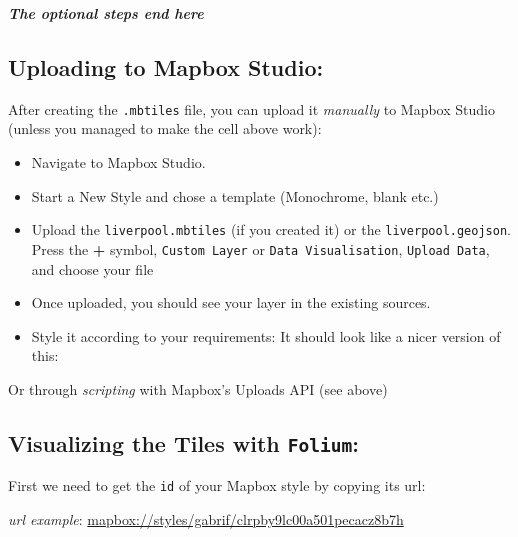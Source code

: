 \documentclass[
  letterpaper,
  DIV=11,
  numbers=noendperiod]{scrreprt}
\providecommand{\tightlist}{%
  \setlength{\itemsep}{0pt}\setlength{\parskip}{0pt}}\usepackage{longtable,booktabs,array}
\begin{document}
\textbf{\emph{The optional steps end here}}

\subsection{\texorpdfstring{Uploading to \textbf{Mapbox
Studio}:}{Uploading to Mapbox Studio:}}\label{uploading-to-mapbox-studio}

After creating the \texttt{.mbtiles} file, you can upload it
\emph{manually} to Mapbox Studio (unless you managed to make the cell
above work):

\begin{itemize}
\tightlist
\item
  Navigate to Mapbox Studio.
\item
  Start a New Style and chose a template (Monochrome, blank etc.)
\end{itemize}

\begin{itemize}
\tightlist
\item
  Upload the \texttt{liverpool.mbtiles} (if you created it) or the
  \texttt{liverpool.geojson}. Press the \textbf{+} symbol,
  \texttt{Custom\ Layer} or \texttt{Data\ Visualisation},
  \texttt{Upload\ Data}, and choose your file
\end{itemize}

\begin{itemize}
\tightlist
\item
  Once uploaded, you should see your layer in the existing sources.
\end{itemize}

\begin{itemize}
\tightlist
\item
  Style it according to your requirements: It should look like a nicer
  version of this:
\end{itemize}

Or through \emph{scripting} with Mapbox's Uploads API (see above)

\subsection{\texorpdfstring{Visualizing the Tiles with
\texttt{Folium}:}{Visualizing the Tiles with Folium:}}\label{visualizing-the-tiles-with-folium}

First we need to get the \texttt{id} of your Mapbox style by copying its
url:

\emph{url example}:
\url{mapbox://styles/gabrif/clrpby9lc00a501pecacz8b7h}
\end{document}

